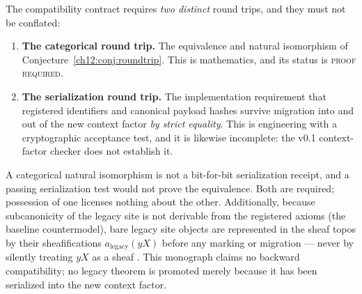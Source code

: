 \begin{boundary}
\label{ch12:bnd:tworoundtrips}
The compatibility contract requires \emph{two distinct} round trips, and
they must not be conflated:
\begin{enumerate}
\item \textbf{The categorical round trip.} The equivalence and natural
isomorphism of Conjecture~\ref{ch12:conj:roundtrip}. This is mathematics,
and its status is \textsc{proof required}.
\item \textbf{The serialization round trip.} The implementation requirement
that registered identifiers and canonical payload hashes survive migration
into and out of the new context factor \emph{by strict equality}. This is
engineering with a cryptographic acceptance test, and it is likewise
incomplete: the v0.1 context-factor checker does not establish it.
\end{enumerate}
A categorical natural isomorphism is not a bit-for-bit serialization
receipt, and a passing serialization test would not prove the equivalence.
Both are required; possession of one licenses nothing about the other.
Additionally, because subcanonicity of the legacy site is not derivable
from the registered axioms (the baseline countermodel), bare legacy site
objects are represented in the sheaf topos by their sheafifications
$a_{\mathrm{legacy}}(yX)$ before any marking or migration --- never by
silently treating $yX$ as a sheaf \cite{stacks00WO}. This monograph claims
no backward compatibility; no legacy theorem is promoted merely because it
has been serialized into the new context factor.
\end{boundary}

